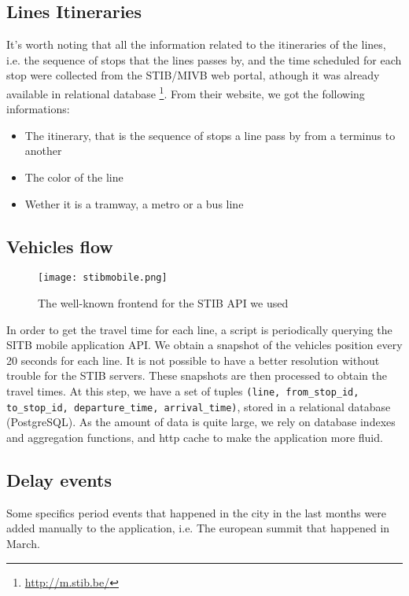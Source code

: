 \documentclass[11pt]{article}%
\begin{document}
\subsection{Lines Itineraries}
It's worth noting that all the information related to the itineraries of the lines, i.e. the sequence of stops that the lines passes by, and the time scheduled for each stop were collected from the STIB/MIVB web portal, athough it was already available in relational database \footnote{\url{http://m.stib.be/}}. From their website, we got the following informations:
\begin{itemize}
    \item The itinerary, that is the sequence of stops a line pass by from a terminus to another
    \item The color of the line
    \item Wether it is a tramway, a metro or a bus line
\end{itemize}

\subsection{Vehicles flow}
\begin{figure}[H]
    \center
    \texttt{[image: stibmobile.png]}
    \caption{\label{fig:stibmobile-app} The well-known frontend for the STIB API we used}
\end{figure}

In order to get the travel time for each line, a script is periodically querying the SITB mobile application API. We obtain a snapshot of the vehicles position every 20 seconds for each line. It is not possible to have a better resolution without trouble for the STIB servers. These snapshots are then processed to obtain the travel times. At this step, we have a set of tuples \texttt{(line, from\_stop\_id, to\_stop\_id, departure\_time, arrival\_time)}, stored in a relational database (PostgreSQL). As the amount of data is quite large, we rely on database indexes and aggregation functions, and http cache to make the application more fluid.

\subsection{Delay events}
Some specifics period events that happened in the city in the last months were added manually to the application, i.e. The european summit that happened in March.                       
                       
\end{document}
